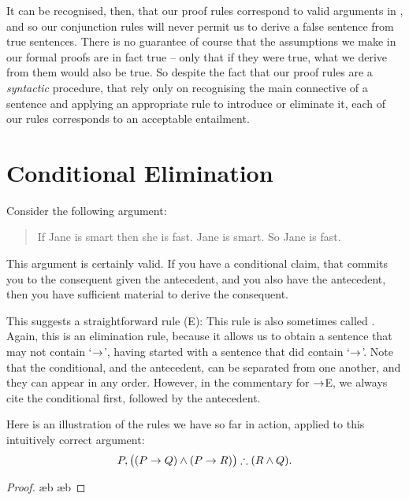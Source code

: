 It can be recognised, then, that our proof rules correspond to valid arguments in \TFL, and so our conjunction rules will never permit us to derive a false sentence from true sentences. There is no guarantee of course that the assumptions we make in our formal proofs are in fact true – only that if they were true, what we derive from them would also be true. So despite the fact that our proof rules are a \emph{syntactic} procedure, that rely only on recognising the main connective of a sentence and applying an appropriate rule to introduce or eliminate it, each of our rules corresponds to an acceptable entailment.


\section{Conditional Elimination}\label{condelim}
Consider the following argument:
	\begin{quote}
		If Jane is smart then she is fast. Jane is smart. So Jane is fast.
	\end{quote}
This argument is certainly valid. If you have a conditional claim, that commits you to the consequent given the antecedent, and you also have the antecedent, then you have sufficient material to derive the consequent. 

This suggests a straightforward  rule ({\eif}E):
This rule is also sometimes called . Again, this is an elimination rule, because it allows us to obtain a sentence that may not contain `$\rightarrow$', having started with a sentence that did contain `$\rightarrow$'. Note that the conditional, and the antecedent, can be separated from one another, and they can appear in any order. However, in the commentary for $\rightarrow$E, we always cite the conditional first, followed by the antecedent.

Here is an illustration of the rules we have so far in action, applied to this intuitively correct argument: $$P, \bigl((P \rightarrow Q)\wedge(P \rightarrow R)\bigr) \mathrel{\therefore} (R \wedge Q).$$ \begin{proof}
	\open
	\ae{b}
	\ae{b}
\end{proof}\label{proof.within}

